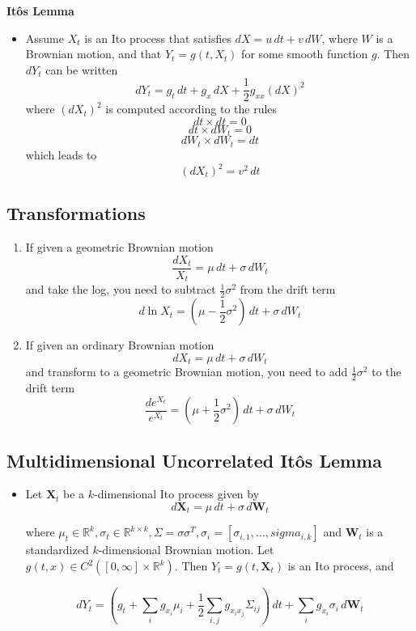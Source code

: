 \documentclass[11pt]{article}
\begin{document}
\textbf{It\^{o}s Lemma}
\begin{itemize}
    \item Assume $X_t$ is an Ito process that satisfies $dX = u \, dt + v \,dW$, where $W$ is 
    a Brownian motion, and that $Y_t = g(t, X_t)$ for some smooth function $g$. Then $dY_t$ 
    can be written 
    \[dY_t = g_t \,dt + g_x \,dX + \frac{1}{2} g_{xx} {(dX)}^2\]
    where ${(dX_t)}^2$ is computed according to the rules 
    \[dt \times dt = 0\]
    \[dt \times dW_t = 0\]
    \[dW_t \times dW_t = dt\]
    which leads to 
    \[{(dX_t)}^2 = v^2 \,dt\]
\end{itemize}

\subsection{Transformations}
\begin{enumerate}
    \item If given a geometric Brownian motion
    \[\frac{dX_t}{X_t}=\mu \,dt + \sigma \,dW_t\]
    and take the log, you need to subtract $\frac{1}{2} \sigma^2$ from the drift term 
    \[d\ln{X_t}= (\mu - \frac{1}{2} \sigma^2)\,dt + \sigma \,dW_t\]
    \item If given an ordinary Brownian motion
    \[dX_t = \mu\,dt + \sigma \,dW_t\]
    and transform to a geometric Brownian motion, you need to add $\frac{1}{2} \sigma^2$ to the 
    drift term 
    \[\frac{d e^{X_t}}{e^{X_t}}= (\mu + \frac{1}{2} \sigma^2)\,dt + \sigma \,dW_t\]
\end{enumerate}

\subsection{Multidimensional Uncorrelated It\^{o}s Lemma}
\begin{itemize}
    \item Let $\boldsymbol{X}_t$ be a $k$-dimensional Ito process given by 
    \[d\boldsymbol{X}_t=\mu\,dt + \sigma \,d\boldsymbol{W}_t\]

    where $\mu_t \in \mathbb{R}^k, \sigma_t \in \mathbb{R}^{k \times k}, \Sigma = \sigma \sigma^T, \sigma_i = 
    [\sigma_{i,1}, \ldots, sigma_{i,k}]$ and $\boldsymbol{W}_t$ is a standardized 
    $k$-dimensional Brownian motion. Let $g(t,x) \in C^2 ([0, \infty] \times \mathbb{R}^k)$.
    Then $Y_t = g(t, \boldsymbol{X}_t)$ is an Ito process, and 

    \[
    dY_t = \left(g_t + \sum_{i} g_{x_i} \mu_i + \frac{1}{2} \sum_{i,j} g_{x_i x_j} \Sigma_{ij}
    \right)\,dt + \sum_{i} g_{x_i} \sigma_i \,d\boldsymbol{W}_t
    \]
\end{itemize}
\end{document}
